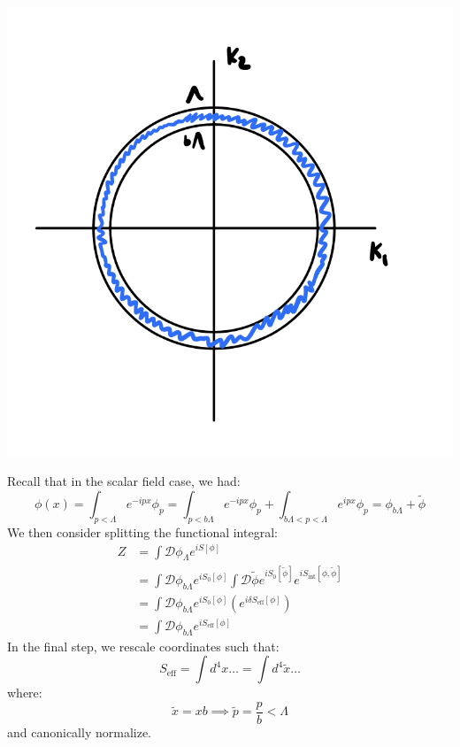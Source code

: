 \begin{center}
    \includegraphics[scale=0.35]{Lectures/Images/lec11-energyshell.png}
\end{center}

Recall that in the scalar field case, we had:
\begin{equation}
    \phi(x) = \int_{p < \Lambda}e^{-ipx}\phi_p = \int_{p < b\Lambda}e^{-ipx}\phi_p + \int_{b\Lambda < p < \Lambda}e^{ipx}\phi_p = \phi_{b\Lambda} + \tilde{\phi}
\end{equation}
We then consider splitting the functional integral:
\begin{equation}
    \begin{split}
        Z &= \int \mathcal{D}\phi_\Lambda e^{iS[\phi]} 
        \\ &= \int \mathcal{D}\phi_{b\Lambda} e^{iS_0[\phi]}\int \mathcal{D}\tilde{\phi}e^{iS_0[\tilde{\phi}]}e^{iS_{\text{int}}[\phi, \tilde{\phi}]}
        \\ &= \int \mathcal{D}\phi_{b\Lambda} e^{iS_0[\phi]}\left(e^{i\delta S_{\text{eff}}[\phi]}\right)
        \\ &= \int \mathcal{D}\phi_{b\Lambda}e^{iS_{\text{eff}}[\phi]}
    \end{split}
\end{equation}
In the final step, we rescale coordinates such that:
\begin{equation}
    S_{\text{eff}} = \int d^4x \ldots = \int d^4\tilde{x} \ldots
\end{equation}
where:
\begin{equation}
    \tilde{x} = xb \implies \tilde{p} = \frac{p}{b} < \Lambda
\end{equation}
and canonically normalize.

